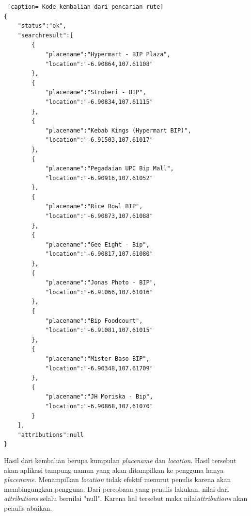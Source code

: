 \begin{lstlisting} [caption= Kode kembalian dari pencarian rute]
{ 
	"status":"ok",
	"searchresult":[
		{
			"placename":"Hypermart - BIP Plaza",
			"location":"-6.90864,107.61108"
		},
		{
			"placename":"Stroberi - BIP",
			"location":"-6.90834,107.61115"
		},
		{
			"placename":"Kebab Kings (Hypermart BIP)",
			"location":"-6.91503,107.61017"
		},
		{
			"placename":"Pegadaian UPC Bip Mall",
			"location":"-6.90916,107.61052"
		},
		{
			"placename":"Rice Bowl BIP",
			"location":"-6.90873,107.61088"
		},
		{	
			"placename":"Gee Eight - Bip",
			"location":"-6.90817,107.61080"
		},
		{
			"placename":"Jonas Photo - BIP",
			"location":"-6.91066,107.61016"
		},
		{
			"placename":"Bip Foodcourt",
			"location":"-6.91081,107.61015"
		},
		{
			"placename":"Mister Baso BIP",
			"location":"-6.90348,107.61709"
		},
		{
			"placename":"JH Moriska - Bip",
			"location":"-6.90868,107.61070"
		}
	],
	"attributions":null
}
\end{lstlisting}

Hasil dari kembalian berupa kumpulan \textit{placename} dan \textit{location}. Hasil tersebut akan aplikasi tampung namun yang akan ditampilkan ke pengguna hanya \textit{placename}. Menampilkan \textit{location} tidak efektif menurut penulis karena akan membingungkan pengguna. Dari percobaan yang penulis lakukan, nilai dari \textit{attributions} selalu bernilai "null". Karena hal tersebut maka nilai\textit{attributions} akan penulis abaikan.

